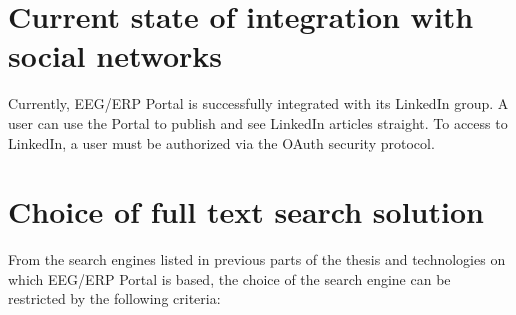 \documentclass[12pt, oneside, a4paper]{book}
\begin{document}
\section{Current state of integration with social networks}

Currently, EEG/ERP Portal is successfully integrated with its LinkedIn group. A user can use the Portal to publish and see LinkedIn articles straight. To access to LinkedIn, a user must be authorized via the OAuth security protocol.


\section{Choice of full text search solution}

From the search engines listed in previous parts of the thesis and technologies on which EEG/ERP Portal is based, the choice of the search engine can be restricted by the following criteria:
\end{document}
